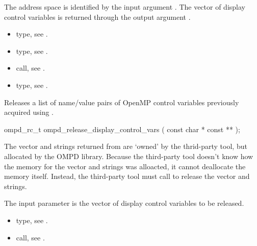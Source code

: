 \argdesc
The address space is identified by the input argument .
The vector of display control variables is returned through
the output argument .

\crossreferences
\begin{itemize}
	\item {} type, see 
	.
	\item {} type, see .
	\item {} call, see .
	\item {} type, see 
	.
\end{itemize}


\label{subsubsubsec:ompd_release_display_control_vars}
\summary

Releases a list of name/value pairs of OpenMP control variables
previously acquired using .
\format
\begin{cspecific}
\begin{ompSyntax}
ompd_rc_t ompd_release_display_control_vars (
  const char * const **
);
\end{ompSyntax}
\end{cspecific}

\descr
The vector and strings returned from 
are `owned' by the thrid-party tool, but allocated by the OMPD library.
Because the third-party tool doesn't know how the memory for the vector
and strings was alloacted, it cannot deallocate the memory itself.
Instead, the third-party tool must call
 to release the vector
and strings.

\argdesc
The input parameter  is the vector of display control variables to be released.

\crossreferences
\begin{itemize}
  \item {} type, see .
	\item {} call, see .
\end{itemize}


